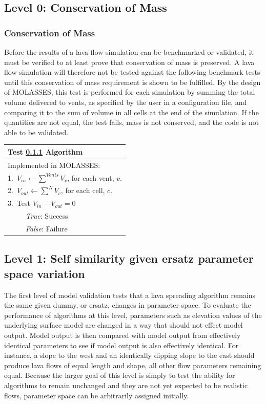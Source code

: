 \documentclass[12pt,letter]{article}
\newcommand{\tabitem}{~~\llap{\textbullet}~~}
\begin{document}
	\subsection{Level 0: Conservation of Mass}
		\subsubsection{Conservation of Mass}\label{test:CoM}
			Before the results of a lava flow simulation can be benchmarked or validated, it must be verified to at least prove that conservation of mass is preserved. A lava flow simulation will therefore not be tested against the following benchmark tests until this conservation of mass requirement is shown to be fulfilled. By the design of MOLASSES, this test is performed for each simulation by summing the total volume delivered to vents, as specified by the user in a configuration file, and comparing it to the sum of volume in all cells at the end of the simulation. If the quantities are not equal, the test fails, mass is not conserved, and the code is not able to be validated.
	
			\begin{center}
				\begin{tabular}{l}
					\toprule
					\textbf{Test \ref{test:CoM} Algorithm}\\
					\midrule
					Implemented in MOLASSES:\\
					1.~$V_{in}\leftarrow \displaystyle\sum^{Vents} V_{v}$, for each vent, $v$.\\
					2.~$V_{out}\leftarrow \displaystyle\sum^N V_{c}$, for each cell, $c$.\\
					3.~Test $V_{in}-V_{out}=0$\\
					~\tabitem \textit{True}: Success\\
					~\tabitem \textit{False}: Failure\\
					\bottomrule
				\end{tabular}
			\end{center}

	\subsection{Level 1: Self similarity given ersatz parameter space variation}
		The first level of model validation tests that a lava spreading algorithm remains the same given dummy, or ersatz, changes in parameter space. To evaluate the performance of algorithms at this level, parameters such as elevation values of the underlying surface model are changed in a way that should not effect model output. Model output is then compared with model output from effectively identical parameters to see if model output is also effectively identical. For instance, a slope to the west and an identically dipping slope to the east should produce lava flows of equal length and shape, all other flow parameters remaining equal. Because the larger goal of this level is simply to test the ability for algorithms to remain unchanged and they are not yet expected to be realistic flows, parameter space can be arbitrarily assigned initially.
		
\end{document}
